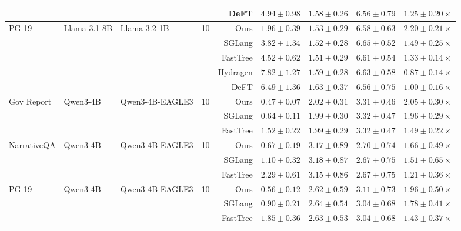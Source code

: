 \begin{table}
{\begin{tabular}{lllcrrrrr}
  & & & & DeFT         & $4.94 \pm 0.98$ & $1.58 \pm 0.26$ & $6.56 \pm 0.79$ & $1.25 \pm 0.20\times$ \\
\midrule
\multirow{5}{*}{PG-19}
  & \multirow{5}{*}{Llama-3.1-8B} & \multirow{5}{*}{Llama-3.2-1B} & \multirow{5}{*}{10}
  & Ours         & $\mathbf{1.96 \pm 0.39}$ & $1.53 \pm 0.29$ & $6.58 \pm 0.63$ & $\mathbf{2.20 \pm 0.21\times}$ \\
  & & & & SGLang       & $3.82 \pm 1.34$ & $1.52 \pm 0.28$ & $6.65 \pm 0.52$ & $1.49 \pm 0.25\times$ \\
  & & & & FastTree     & $4.52 \pm 0.62$ & $1.51 \pm 0.29$ & $6.61 \pm 0.54$ & $1.33 \pm 0.14\times$ \\
  & & & & Hydragen     & $7.82 \pm 1.27$ & $1.59 \pm 0.28$ & $6.63 \pm 0.58$ & $0.87 \pm 0.14\times$ \\
  & & & & DeFT         & $6.49 \pm 1.36$ & $1.63 \pm 0.37$ & $6.56 \pm 0.75$ & $1.00 \pm 0.16\times$ \\
\midrule
\multirow{3}{*}{Gov Report}
  & \multirow{3}{*}{Qwen3-4B} & \multirow{3}{*}{Qwen3-4B-EAGLE3} & \multirow{3}{*}{10}
  & Ours         & $\mathbf{0.47 \pm 0.07}$ & $2.02 \pm 0.31$ & $3.31 \pm 0.46$ & $\mathbf{2.05 \pm 0.30\times}$ \\
  & & & & SGLang       & $0.64 \pm 0.11$ & $1.99 \pm 0.30$ & $3.32 \pm 0.47$ & $1.96 \pm 0.29\times$ \\
  & & & & FastTree     & $1.52 \pm 0.22$ & $1.99 \pm 0.29$ & $3.32 \pm 0.47$ & $1.49 \pm 0.22\times$ \\
\midrule
\multirow{3}{*}{NarrativeQA}
  & \multirow{3}{*}{Qwen3-4B} & \multirow{3}{*}{Qwen3-4B-EAGLE3} & \multirow{3}{*}{10}
  & Ours         & $\mathbf{0.67 \pm 0.19}$ & $3.17 \pm 0.89$ & $2.70 \pm 0.74$ & $\mathbf{1.66 \pm 0.49\times}$ \\
  & & & & SGLang       & $1.10 \pm 0.32$ & $3.18 \pm 0.87$ & $2.67 \pm 0.75$ & $1.51 \pm 0.65\times$ \\
  & & & & FastTree     & $2.29 \pm 0.61$ & $3.15 \pm 0.86$ & $2.67 \pm 0.75$ & $1.21 \pm 0.36\times$ \\
\midrule
\multirow{3}{*}{PG-19}
  & \multirow{3}{*}{Qwen3-4B} & \multirow{3}{*}{Qwen3-4B-EAGLE3} & \multirow{3}{*}{10}
  & Ours         & $\mathbf{0.56 \pm 0.12}$ & $2.62 \pm 0.59$ & $3.11 \pm 0.73$ & $\mathbf{1.96 \pm 0.50\times}$ \\
  & & & & SGLang       & $0.90 \pm 0.21$ & $2.64 \pm 0.54$ & $3.04 \pm 0.68$ & $1.78 \pm 0.41\times$ \\
  & & & & FastTree     & $1.85 \pm 0.36$ & $2.63 \pm 0.53$ & $3.04 \pm 0.68$ & $1.43 \pm 0.37\times$ \\

\end{tabular}}
\end{table}
